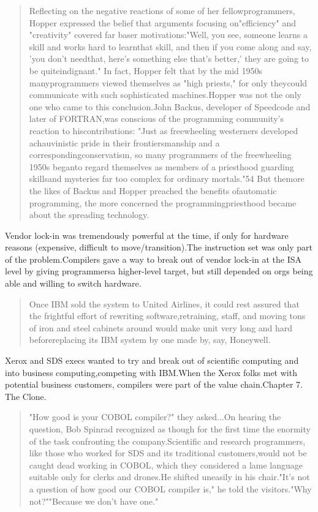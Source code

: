 \begin{quotation}
Reflecting on the negative reactions of some of her fellowprogrammers, Hopper expressed the belief that arguments focusing on"efficiency" and "creativity" covered far baser motivations:"Well, you see, someone learns a skill and works hard to learnthat skill, and then if you come along and say, 'you don't needthat, here's something else that's better,' they are going to be quiteindignant." In fact, Hopper felt that by the mid 1950s manyprogrammers viewed themselves as "high priests," for only theycould communicate with such sophisticated machines.Hopper was not the only one who came to this conclusion.John Backus, developer of Speedcode and later of FORTRAN,was conscious of the programming community's reaction to hiscontributions: "Just as freewheeling westerners developed achauvinistic pride in their frontiersmanship and a correspondingconservatism, so many programmers of the freewheeling 1950s beganto regard themselves as members of a priesthood guarding skillsand mysteries far too complex for ordinary mortals."54 But themore the likes of Backus and Hopper preached the benefits ofautomatic programming, the more concerned the programmingpriesthood became about the spreading technology.\end{quotation}
Vendor lock-in was tremendously powerful at the time, if only for hardware reasons (expensive, difficult to move/transition).The instruction set was only part of the problem.Compilers gave a way to break out of vendor lock-in at the ISA level by giving programmersa higher-level target, but still depended on orgs being able and willing to switch hardware.\begin{quotation}
Once IBM sold the system to United Airlines, it could rest assured that the frightful effort of rewriting software,retraining, staff, and moving tons of iron and steel cabinets around would make unit very long and hard beforereplacing its IBM system by one made by, say, Honeywell.\end{quotation}
Xerox and SDS execs wanted to try and break out of scientific computing and into business computing,competing with IBM.When the Xerox folks met with potential business customers, compilers were part of the value chain.Chapter 7. The Clone.\begin{quotation}
"How good is your COBOL compiler?" they asked...On hearing the question, Bob Spinrad recognized as though for the first time the enormity of the task confronting the company.Scientific and research programmers, like those who worked for SDS and its traditional customers,would not be caught dead working in COBOL, which they considered a lame language suitable only for clerks and drones.He shifted uneasily in his chair."It's not a question of how good our COBOL compiler is," he told the visitors."Why not?""Because we don't have one."\end{quotation}
